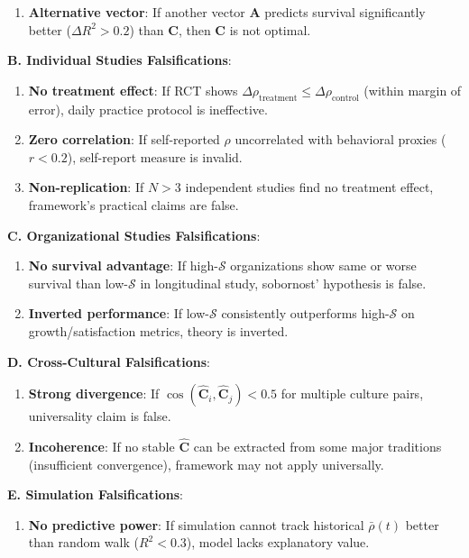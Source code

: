 \documentclass[11pt,a4paper]{article}
\theoremstyle{definition}
\theoremstyle{remark}
\begin{document}
\begin{small}
\begin{enumerate}
\begin{mdframed}[backgroundcolor=red!10,linewidth=2pt,linecolor=red!70!black]
\begin{enumerate}
    \item \textbf{Alternative vector}: If another vector \(\mathbf{A}\) predicts survival significantly better (\(\Delta R^2 > 0.2\)) than \(\mathbf{C}\), then \(\mathbf{C}\) is not optimal.
\end{enumerate}

\textbf{B. Individual Studies Falsifications}:
\begin{enumerate}
    \item \textbf{No treatment effect}: If RCT shows \(\Delta\rho_{\text{treatment}} \leq \Delta\rho_{\text{control}}\) (within margin of error), daily practice protocol is ineffective.
    
    \item \textbf{Zero correlation}: If self-reported \(\rho\) uncorrelated with behavioral proxies (\(r < 0.2\)), self-report measure is invalid.
    
    \item \textbf{Non-replication}: If \(N > 3\) independent studies find no treatment effect, framework's practical claims are false.
\end{enumerate}

\textbf{C. Organizational Studies Falsifications}:
\begin{enumerate}
    \item \textbf{No survival advantage}: If high-\(\mathcal{S}\) organizations show same or worse survival than low-\(\mathcal{S}\) in longitudinal study, sobornost' hypothesis is false.
    
    \item \textbf{Inverted performance}: If low-\(\mathcal{S}\) consistently outperforms high-\(\mathcal{S}\) on growth/satisfaction metrics, theory is inverted.
\end{enumerate}

\textbf{D. Cross-Cultural Falsifications}:
\begin{enumerate}
    \item \textbf{Strong divergence}: If \(\cos(\hat{\mathbf{C}}_i, \hat{\mathbf{C}}_j) < 0.5\) for multiple culture pairs, universality claim is false.
    
    \item \textbf{Incoherence}: If no stable \(\hat{\mathbf{C}}\) can be extracted from some major traditions (insufficient convergence), framework may not apply universally.
\end{enumerate}

\textbf{E. Simulation Falsifications}:
\begin{enumerate}
    \item \textbf{No predictive power}: If simulation cannot track historical \(\bar{\rho}(t)\) better than random walk (\(R^2 < 0.3\)), model lacks explanatory value.
    

\end{enumerate}
\end{mdframed}
\end{enumerate}
\end{small}
\end{document}
